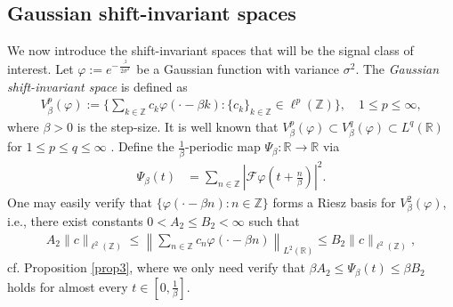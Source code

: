 \documentclass[11pt, reqno]{amsart}
\newtheorem{lemma}[theorem]{Lemma}%
\newcommand{\Z}{\mathbb{Z}}
\newcommand{\R}{\mathbb{R}}
\numberwithin{equation}{section}
\begin{document}
\subsection{Gaussian shift-invariant spaces}
    We now introduce the shift-invariant spaces that will be the signal class of interest. Let $\varphi:= e^{-\frac{\cdot^2}{2\sigma^2}}$ be a Gaussian function with variance $\sigma^2$. The {\em Gaussian shift-invariant space} is defined as
\begin{align}\label{gauss.sis.def}
    V_{\beta}^p(\varphi) := \Big\{ \sum_{k \in \Z} c_k \varphi(\cdot - \beta k) : \{c_k\}_{k\in \Z} \in \ell^p(\Z) \Big\}, \quad 1 \le p \le \infty,
\end{align}
where $\beta > 0$ is the step-size.
It is well known that $ V_{\beta}^p(\varphi) \subset V_{\beta}^q(\varphi) \subset L^q(\R)$ for $1 \le p \le q \le \infty$ \cite{aldroubi2001nonuniform}.
    Define the $\frac{1}{\beta}$-periodic map $\Psi_{\beta} : \R \to \R$ via
    \begin{align}\label{psi.beta.eq}
        \Psi_{\beta} (t) {}& = \sum_{n \in \Z} |\mathcal{F} \varphi (t + \frac{n}{\beta}) |^2.
    \end{align}
    One may easily verify that  $\{\varphi(\cdot - \beta n): n\in \Z \}$ forms a Riesz basis for $V_{\beta}^2(\varphi)$, i.e., there exist constants $0<A_2\le B_2<\infty$ such that
    \begin{align}\label{eq90}
        A_2\|c\|_{\ell^2(\Z)} \le \left\| \sum_{n\in \Z} c_n \varphi(\cdot - \beta n) \right\|_{L^2(\R)} \le B_2\|c\|_{\ell^2(\Z)},
    \end{align}
    cf. Proposition \ref{prop3}, where we only need verify that $\beta A_2 \le \Psi_{\beta}(t) \le \beta B_2$ holds for almost every $t\in [0,\frac{1}{\beta}]$.
    
   
   
    
      
\end{document}
